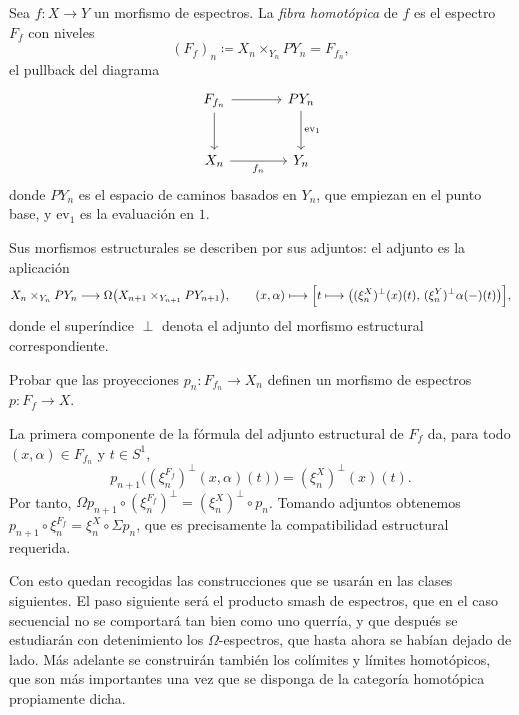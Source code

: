 \begin{defi}\label{defi:fibra-espectros}
Sea $f\colon X\to Y$ un morfismo de espectros. La \emph{fibra homotópica} de $f$ es el espectro $F_f$ con niveles
\[
(F_f)_n\coloneqq X_n\times_{Y_n}PY_n=F_{f_n},
\]
el pullback del diagrama
\[
\begin{tikzcd}[column sep=large, row sep=large]
F_{f_n} \arrow[r] \arrow[d] & PY_n \arrow[d,"\mathrm{ev}_1"]\\
X_n \arrow[r,"f_n"'] & Y_n
\end{tikzcd}
\]
donde $PY_n$ es el espacio de caminos basados en $Y_n$, que empiezan en el punto base, y $\mathrm{ev}_1$ es la evaluación en $1$.
\end{defi}

Sus morfismos estructurales se describen por sus adjuntos: el adjunto es la aplicación
\[
X_n\times_{Y_n}PY_n\longrightarrow\Omega\bigl(X_{n+1}\times_{Y_{n+1}}PY_{n+1}\bigr),
\qquad
(x,\alpha)\longmapsto\Bigl[t\longmapsto\bigl((\xi_n^X)^{\perp}(x)(t),\,(\xi_n^Y)^{\perp}\alpha(-)(t)\bigr)\Bigr],
\]
donde el superíndice $\perp$ denota el adjunto del morfismo estructural correspondiente.

\begin{ejer}
Probar que las proyecciones $p_n\colon F_{f_n}\to X_n$ definen un morfismo de espectros $p\colon F_f\to X$.
\end{ejer}
\begin{sol}
La primera componente de la fórmula del adjunto estructural de $F_f$ da, para todo $(x,\alpha)\in F_{f_n}$ y $t\in S^1$,
\[
p_{n+1}\bigl((\xi_n^{F_f})^\perp(x,\alpha)(t)\bigr)
=(\xi_n^X)^\perp(x)(t).
\]
Por tanto, $\Omega p_{n+1}\circ(\xi_n^{F_f})^\perp=(\xi_n^X)^\perp\circ p_n$. Tomando adjuntos obtenemos $p_{n+1}\circ\xi_n^{F_f}=\xi_n^X\circ\Sigma p_n$, que es precisamente la compatibilidad estructural requerida.
\end{sol}

Con esto quedan recogidas las construcciones que se usarán en las clases siguientes. El paso siguiente será el producto smash de espectros, que en el caso secuencial no se comportará tan bien como uno querría, y que después se estudiarán con detenimiento los $\Omega$-espectros, que hasta ahora se habían dejado de lado. Más adelante se construirán también los colímites y límites homotópicos, que son más importantes una vez que se disponga de la categoría homotópica propiamente dicha.
